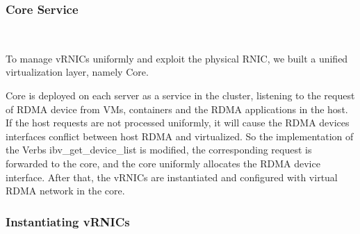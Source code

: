 



\subsubsection{\textbf{\sys Core Service}}
\
\noindent


To manage vRNICs uniformly and exploit the physical RNIC, we built a unified virtualization layer, namely \sys Core. 

\sys Core is deployed on each server as a service in the cluster, listening to the request of RDMA device from VMs, containers and the RDMA applications in the host. If the host requests are not processed uniformly, it will cause the RDMA devices interfaces conflict between host RDMA and virtualized. So the implementation of the Verbs ibv\_get\_device\_list is modified, the corresponding request is forwarded to the \sys core, and the \sys core uniformly allocates the RDMA device interface. After that, the vRNICs are instantiated and configured with virtual RDMA network in the \sys core.



\subsubsection{\textbf{Instantiating vRNICs}}
\
\noindent

